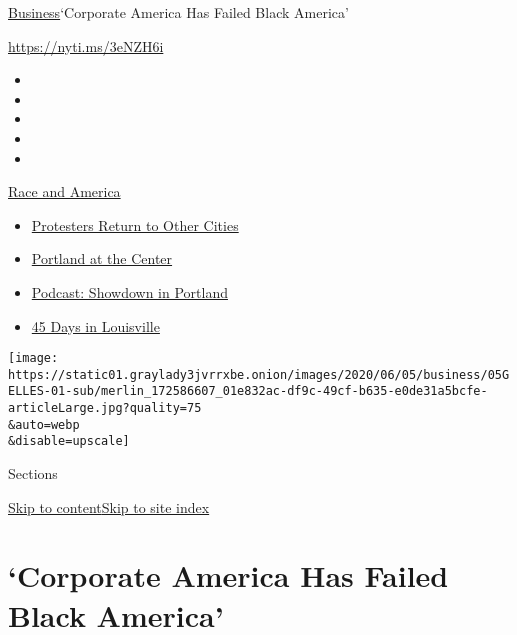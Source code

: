 \href{/section/business}{Business}\textbar{}`Corporate America Has
Failed Black America'

\url{https://nyti.ms/3eNZH6i}

\begin{itemize}
\item
\item
\item
\item
\item
\end{itemize}

\href{https://www.nytimes3xbfgragh.onion/news-event/george-floyd-protests-minneapolis-new-york-los-angeles?action=click\&pgtype=Article\&state=default\&region=TOP_BANNER\&context=storylines_menu}{Race
and America}

\begin{itemize}
\tightlist
\item
  \href{https://www.nytimes3xbfgragh.onion/2020/07/26/us/protests-portland-seattle-trump.html?action=click\&pgtype=Article\&state=default\&region=TOP_BANNER\&context=storylines_menu}{Protesters
  Return to Other Cities}
\item
  \href{https://www.nytimes3xbfgragh.onion/2020/07/24/us/portland-oregon-protests-white-race.html?action=click\&pgtype=Article\&state=default\&region=TOP_BANNER\&context=storylines_menu}{Portland
  at the Center}
\item
  \href{https://www.nytimes3xbfgragh.onion/2020/07/23/podcasts/the-daily/portland-protests.html?action=click\&pgtype=Article\&state=default\&region=TOP_BANNER\&context=storylines_menu}{Podcast:
  Showdown in Portland}
\item
  \href{https://www.nytimes3xbfgragh.onion/interactive/2020/07/16/us/black-lives-matter-protests-louisville-breonna-taylor.html?action=click\&pgtype=Article\&state=default\&region=TOP_BANNER\&context=storylines_menu}{45
  Days in Louisville}
\end{itemize}

\texttt{[image: https://static01.graylady3jvrrxbe.onion/images/2020/06/05/business/05GELLES-01-sub/merlin\_172586607\_01e832ac-df9c-49cf-b635-e0de31a5bcfe-articleLarge.jpg?quality=75\\\&auto=webp\\\&disable=upscale]}

Sections

\protect\hyperlink{site-content}{Skip to
content}\protect\hyperlink{site-index}{Skip to site index}

\hypertarget{corporate-america-has-failed-black-america}{%
\section{`Corporate America Has Failed Black
America'}\label{corporate-america-has-failed-black-america}}

